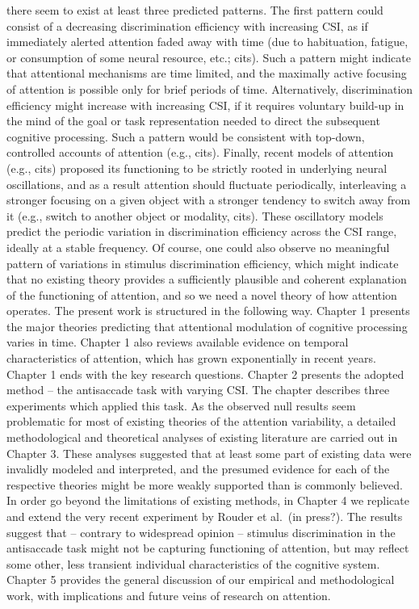 \documentclass[
  man,draftall]{apa6}
\begin{document}
there seem to exist at least three predicted patterns. The first pattern could consist of a decreasing
discrimination efficiency with increasing CSI, as if immediately alerted attention faded away with
time (due to habituation, fatigue, or consumption of some neural resource, etc.; cits). Such a pattern
might indicate that attentional mechanisms are time limited, and the maximally active focusing of
attention is possible only for brief periods of time. Alternatively, discrimination efficiency might
increase with increasing CSI, if it requires voluntary build-up in the mind of the goal or task
representation needed to direct the subsequent cognitive processing. Such a pattern would be
consistent with top-down, controlled accounts of attention (e.g., cits). Finally, recent models of
attention (e.g., cits) proposed its functioning to be strictly rooted in underlying neural oscillations,
and as a result attention should fluctuate periodically, interleaving a stronger focusing on a given
object with a stronger tendency to switch away from it (e.g., switch to another object or modality,
cits). These oscillatory models predict the periodic variation in discrimination efficiency across the CSI
range, ideally at a stable frequency. Of course, one could also observe no meaningful pattern of
variations in stimulus discrimination efficiency, which might indicate that no existing theory provides
a sufficiently plausible and coherent explanation of the functioning of attention, and so we need a
novel theory of how attention operates.
The present work is structured in the following way. Chapter 1 presents the major theories predicting
that attentional modulation of cognitive processing varies in time. Chapter 1 also reviews available
evidence on temporal characteristics of attention, which has grown exponentially in recent years.
Chapter 1 ends with the key research questions. Chapter 2 presents the adopted method -- the
antisaccade task with varying CSI. The chapter describes three experiments which applied this task.
As the observed null results seem problematic for most of existing theories of the attention
variability, a detailed methodological and theoretical analyses of existing literature are carried out in
Chapter 3. These analyses suggested that at least some part of existing data were invalidly modeled
and interpreted, and the presumed evidence for each of the respective theories might be more
weakly supported than is commonly believed. In order go beyond the limitations of existing methods,
in Chapter 4 we replicate and extend the very recent experiment by Rouder et al.~(in press?). The
results suggest that -- contrary to widespread opinion -- stimulus discrimination in the antisaccade
task might not be capturing functioning of attention, but may reflect some other, less transient
individual characteristics of the cognitive system. Chapter 5 provides the general discussion of our
empirical and methodological work, with implications and future veins of research on attention.
\end{document}
